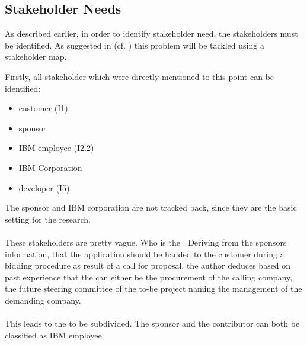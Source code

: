 \subsection{Stakeholder Needs}
As described earlier, in order to identify stakeholder need, the stakeholders must be identified. As suggested in \Cref{} (cf. \cpagerefrange{}{}) this problem will be tackled using a stakeholder map. 

Firstly, all stakeholder which were directly mentioned to this point can be identified:

\begin{multicols}{3}
\begin{itemize}
    \item customer (I1)
    \item sponsor
    \item IBM employee (I2.2)
    \item IBM Corporation
    \item developer (I5)
\end{itemize}
\end{multicols}

The sponsor and IBM corporation are not tracked back, since they are the basic setting for the research.

\paragraph{} These stakeholders are pretty vague. Who is the . Deriving from the sponsors information, that the application should be handed to the customer during a bidding procedure as result of a call for proposal, the author deduces based on past experience that the  can either be the procurement of the calling company, the future steering committee of the to-be project naming the management of the demanding company. 

\paragraph{} This leads to the  to be subdivided. The sponsor and the contributor can both be classified as IBM employee.

